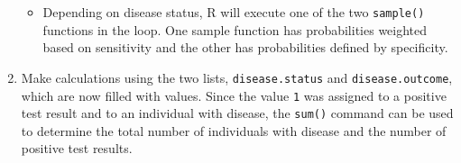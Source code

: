 \documentclass{report}\usepackage[]{graphicx}\usepackage[]{color}
\begin{document}
\begin{enumerate}
\begin{itemize}
    \item Depending on disease status, \textsf{R} will execute one of the two \texttt{sample()} functions in the loop. One sample function has probabilities weighted based on sensitivity and the other has probabilities defined by specificity. 
  
  \end{itemize}
  
  \item Make calculations using the two lists, \texttt{disease.status} and \texttt{disease.outcome}, which are now filled with values. Since the value \texttt{1} was assigned to a positive test result and to an individual with disease, the \texttt{sum()} command can be used to determine the total number of individuals with disease and the number of positive test results. 

\end{enumerate}
\end{document}

